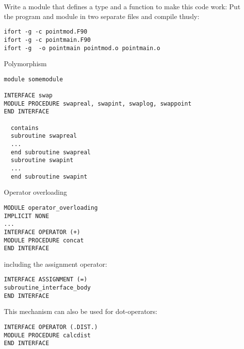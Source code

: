 \begin{exercise}
  \label{ex:fpointmod}
  Write a module  that defines a type  and a
  function  to make this code work:
  Put the program and module in two separate files and compile thusly:
\begin{lstlisting}
ifort -g -c pointmod.F90
ifort -g -c pointmain.F90
ifort -g  -o pointmain pointmod.o pointmain.o 
\end{lstlisting}
\end{exercise}

 {Polymorphism}

\begin{lstlisting}
module somemodule

INTERFACE swap
MODULE PROCEDURE swapreal, swapint, swaplog, swappoint
END INTERFACE

  contains
  subroutine swapreal
  ...
  end subroutine swapreal
  subroutine swapint
  ...
  end subroutine swapint
\end{lstlisting}

 {Operator overloading}

\begin{lstlisting}
MODULE operator_overloading
IMPLICIT NONE
...
INTERFACE OPERATOR (+)
MODULE PROCEDURE concat
END INTERFACE
\end{lstlisting}

including the assignment operator:

\begin{lstlisting}
INTERFACE ASSIGNMENT (=) 
subroutine_interface_body
END INTERFACE
\end{lstlisting}

This mechanism can also be used for dot-operators:

\begin{lstlisting}
INTERFACE OPERATOR (.DIST.)
MODULE PROCEDURE calcdist
END INTERFACE
\end{lstlisting}

